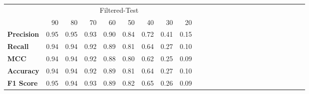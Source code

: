 \begin{tabular}{l|rrrrrrrr|rrrrrrrr|rrrrrrrr}
\toprule
 & \multicolumn{8}{c}{Filtered-Test} \\
 & 90 & 80 & 70 & 60 & 50 & 40 & 30 & 20 \\
\midrule
\textbf{Precision} & 0.95 & 0.95 & 0.93 & 0.90 & 0.84 & 0.72 & 0.41 & 0.15 \\
\textbf{Recall} & 0.94 & 0.94 & 0.92 & 0.89 & 0.81 & 0.64 & 0.27 & 0.10 \\
\textbf{MCC} & 0.94 & 0.94 & 0.92 & 0.88 & 0.80 & 0.62 & 0.25 & 0.09 \\
\textbf{Accuracy} & 0.94 & 0.94 & 0.92 & 0.89 & 0.81 & 0.64 & 0.27 & 0.10 \\
\textbf{F1 Score} & 0.95 & 0.94 & 0.93 & 0.89 & 0.82 & 0.65 & 0.26 & 0.09 \\
\bottomrule
\end{tabular}
